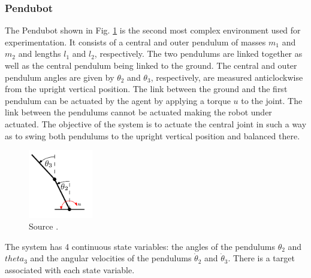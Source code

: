 \subsubsection{Pendubot}
The Pendubot shown in Fig. \ref{Fig:pendubot-environment}  is the second most complex environment used for experimentation. It consists of a central and outer pendulum of masses $m_1$ and $m_2$ and lengths $l_1$ and $l_2$, respectively. The two pendulums are linked together as well as the central pendulum being linked to the ground. The central and outer pendulum angles are given by $\theta_2$ and $\theta_3$, respectively, are measured anticlockwise from the upright vertical position. The link between the ground and the first pendulum can be actuated by the agent by applying a torque $u$ to the joint. The link between the pendulums cannot be actuated making the robot under actuated. The objective of the system is to actuate the central joint in such a way as to swing both pendulums to the upright vertical position and balanced there.
\begin{figure}[H]
\centering    
\includegraphics[width=0.25\textwidth]{Chapter3/Figures/pendubot.png}
\caption[Pendubot PILCO environment]{Source \cite{deisenroth2013pilco-documentation}.}
\label{Fig:pendubot-environment}
\end{figure}
The system has 4 continuous state variables: the angles of the pendulums $\theta_2$ and $theta_3$ and the angular velocities of the pendulums $\dot \theta_2$ and $\dot \theta_3$. There is a target associated with each state variable.

